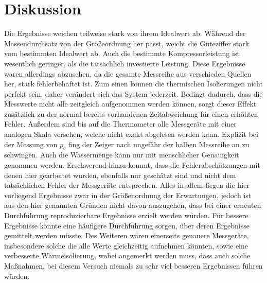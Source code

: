 \section{Diskussion}
\label{sec:Diskussion}
Die Ergebnisse weichen teilweise stark von ihrem Idealwert ab. Während der Massendurchsatz von der Größeordnung her passt, weicht die Güteziffer stark vom bestimmten Idealwert ab.
Auch die bestimmte Kompressorleistung ist wesentlich geringer, als die tatsächlich investierte Leistung.
Diese Ergebnisse waren allerdings abzusehen, da die gesamte Messreihe aus verschieden Quellen her, stark fehlerbehaftet ist.
Zum einen können die thermischen Isolierungen nicht perfekt sein, daher verändert sich das System jederzeit.
Bedingt dadurch, dass die Messwerte nicht alle zeitgleich aufgenommen werden können, sorgt dieser Effekt zusätzlich zu der normal bereits vorhandenen Zeitabweichung für einen erhöhten Fehler.
Außerdem sind bis auf die Thermometer alle Messgeräte mit einer analogen Skala versehen, welche nicht exakt abgelesen werden kann. Explizit bei der Messung von $p_b$ fing der Zeiger nach ungefähr der halben Messreihe an zu schwingen.
Auch die Wassermenge kann nur mit menschlicher Genauigkeit genommen werden.
Erschwerend hinzu kommt, dass die Fehlerabschätzungen mit denen hier gearbeitet wurden, ebenfalls nur geschätzt sind und nicht dem tatsächlichen Fehler der Messgeräte entsprechen.
Alles in allem liegen die hier vorliegend Ergebnisse zwar in der Größenordnung der Erwartungen, jedoch ist aus den hier genannten Gründen nicht davon auszugehen, dass bei einer erneuten Durchführung reproduzierbare Ergebnisse erzielt werden würden.
Für bessere Ergebnisse könnte eine häufigere Durchführung sorgen, über deren Ergebnisse gemittelt werden müsste.
Des Weiteren wären einerseits genauere Messgeräte, insbesondere solche die alle Werte gleichzeitig aufnehmen könnten, sowie eine verbesserte Wärmeisolierung, 
wobei angemerkt werden muss, dass auch solche Maßnahmen, bei diesem Versuch niemals zu sehr viel besseren Ergebnissen führen würden.
